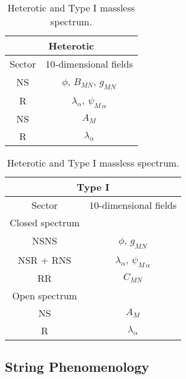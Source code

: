 \documentclass[12pt,a4paper]{book}
\begin{document}
\renewcommand{\arraystretch}{1.4}
\begin{table}[tb]
\begin{center}
\begin{tabular}{cc}
\multicolumn{2}{c}{Heterotic} \\
\hline
Sector & $10$-dimensional fields \\
\hline
NS & $\phi$, $B_{MN}$, $g_{MN}$ \\
R & $\lambda_{\alpha}$, $\psi_{M \, \alpha}$ \\
NS & $A_M$ \\
R & $\lambda_{\dot\alpha}$\\
\hline
\end{tabular} \qquad 
\begin{tabular}{cc}
\multicolumn{2}{c}{Type I} \\
\hline
Sector & $10$-dimensional fields \\
\hline
Closed spectrum &  \\
NSNS & $\phi$, $g_{MN}$ \\
NSR + RNS & $\lambda_{\alpha}$, $\psi_{M \, \alpha}$ \\
RR & $C_{MN}$ \\
\hline
Open spectrum & \\
NS & $A_M$ \\
R & $\lambda_{\dot\alpha}$\\
\hline
\end{tabular}
\caption{Heterotic and Type I massless spectrum.\label{tab:HeteroticTypeISpectrum}}
\vspace{-0.6cm}
\end{center}
\end{table}


\subsection{String Phenomenology}
\label{ssec:StringPhenomenology}
\end{document}
